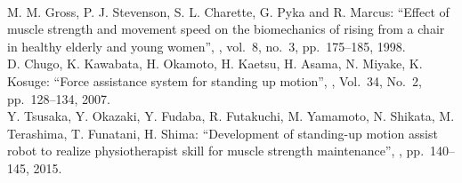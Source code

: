 \begin{mythebibliography}{99}

\leavevmode \\
M. M. Gross, P. J. Stevenson, S. L. Charette, G. Pyka and R. Marcus:
\newblock ``Effect of muscle strength and movement speed on the biomechanics of rising from a chair in healthy elderly and young women'',
, vol.~8, no.~3, pp.~175--185, 1998.
\\


D. Chugo, K. Kawabata, H. Okamoto, H. Kaetsu, H. Asama, N. Miyake, K. Kosuge:
\newblock ``Force assistance system for standing up motion'',
, Vol.~34, No.~2, pp.~128--134, 2007.
\\

Y. Tsusaka, Y. Okazaki, Y. Fudaba, R. Futakuchi, M. Yamamoto, N. Shikata, M. Terashima, T. Funatani, H. Shima:
\newblock ``Development of standing-up motion assist robot to realize physiotherapist skill for muscle strength maintenance'',
, pp.~140--145, 2015.
\\

\clearpage

\end{mythebibliography}

